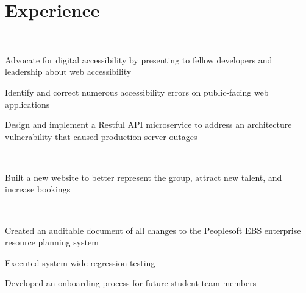 \documentclass[]{hieudo-build}
\begin{document}
\begin{minipage}[t]{0.62\textwidth} 

\section{Experience}

\\
\vspace{0.9em} %
\begin{tightemize}
\item Advocate for digital accessibility by presenting to fellow developers and leadership about web accessibility
\item Identify and correct numerous accessibility errors on public-facing web applications
\item Design and implement a Restful API microservice to address an architecture vulnerability that caused production server outages
\end{tightemize}
\smallsectionsep

 \\
\begin{tightemize}
\item Built a new website to better represent the group, attract new talent, and increase bookings 
\end{tightemize}
\smallsectionsep

 \\
\begin{tightemize}
\item Created an auditable document of all changes to the Peoplesoft EBS enterprise resource planning system
\item Executed system-wide regression testing
\item Developed an onboarding process for future student team members
\end{tightemize}
\sectionsep


\end{minipage}
\end{document}
